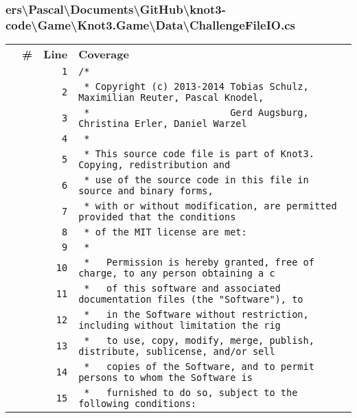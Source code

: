 \documentclass[a4paper,10pt]{article}
\begin{document}
\subsubsection{ers\textbackslash Pascal\textbackslash Documents\textbackslash GitHub\textbackslash knot3-code\textbackslash Game\textbackslash Knot3.Game\textbackslash Data\textbackslash ChallengeFileIO.cs}
\begin{longtable}[l]{lrrl}
\textbf{} & \textbf{\#} & \textbf{Line} & \textbf{Coverage}\\
\cellcolor{gray} &  & \verb~1~ & \verb~/*~\\
\cellcolor{gray} &  & \verb~2~ & \verb~ * Copyright (c) 2013-2014 Tobias Schulz, Maximilian Reuter, Pascal Knodel,~\\
\cellcolor{gray} &  & \verb~3~ & \verb~ *                         Gerd Augsburg, Christina Erler, Daniel Warzel~\\
\cellcolor{gray} &  & \verb~4~ & \verb~ *~\\
\cellcolor{gray} &  & \verb~5~ & \verb~ * This source code file is part of Knot3. Copying, redistribution and~\\
\cellcolor{gray} &  & \verb~6~ & \verb~ * use of the source code in this file in source and binary forms,~\\
\cellcolor{gray} &  & \verb~7~ & \verb~ * with or without modification, are permitted provided that the conditions~\\
\cellcolor{gray} &  & \verb~8~ & \verb~ * of the MIT license are met:~\\
\cellcolor{gray} &  & \verb~9~ & \verb~ *~\\
\cellcolor{gray} &  & \verb~10~ & \verb~ *   Permission is hereby granted, free of charge, to any person obtaining a c~\\
\cellcolor{gray} &  & \verb~11~ & \verb~ *   of this software and associated documentation files (the "Software"), to ~\\
\cellcolor{gray} &  & \verb~12~ & \verb~ *   in the Software without restriction, including without limitation the rig~\\
\cellcolor{gray} &  & \verb~13~ & \verb~ *   to use, copy, modify, merge, publish, distribute, sublicense, and/or sell~\\
\cellcolor{gray} &  & \verb~14~ & \verb~ *   copies of the Software, and to permit persons to whom the Software is~\\
\cellcolor{gray} &  & \verb~15~ & \verb~ *   furnished to do so, subject to the following conditions:~\\

\end{longtable}
\end{document}
